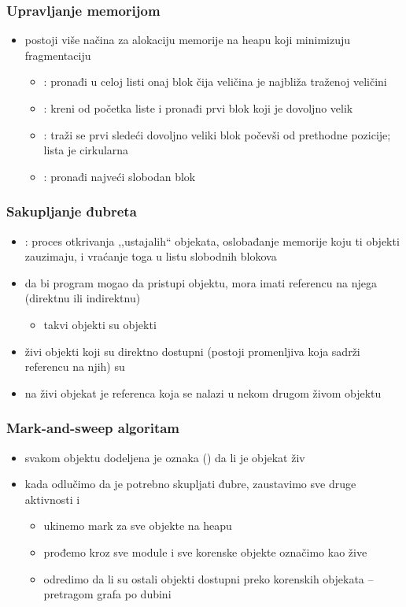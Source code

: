 \documentclass[compress,aspectratio=169]{beamer}
\begin{document}
\begin{frame}[fragile]
  \frametitle{Upravljanje memorijom}
  \begin{itemize}
    \item postoji više načina za alokaciju memorije na heapu koji 
    minimizuju fragmentaciju
    \begin{itemize}
      \item {}: pronađi u celoj listi onaj blok čija 
      veličina je najbliža traženoj veličini 
      \item {}: kreni od početka liste i pronađi prvi
      blok koji je dovoljno velik
      \item {}: traži se prvi sledeći dovoljno veliki blok
      počevši od prethodne pozicije; lista je cirkularna
      \item {}: pronađi najveći slobodan blok
    \end{itemize}
  \end{itemize}
\end{frame}

\begin{frame}[fragile]
  \frametitle{Sakupljanje đubreta}
  \begin{itemize}
    \item {}: proces otkrivanja ,,ustajalih`` 
    objekata, oslobađanje memorije koju ti objekti zauzimaju, i vraćanje 
    toga u listu slobodnih blokova
    \item da bi program mogao da pristupi objektu, mora imati referencu
    na njega (direktnu ili indirektnu)
    \begin{itemize}
      \item takvi objekti su  objekti
    \end{itemize}
    \item živi objekti koji su direktno dostupni (postoji promenljiva
    koja sadrži referencu na njih) su 
    \item {} na živi objekat je referenca koja
    se nalazi u nekom drugom živom objektu
  \end{itemize}
\end{frame}

\begin{frame}[fragile]
  \frametitle{Mark-and-sweep algoritam}
  \begin{itemize}
    \item svakom objektu dodeljena je oznaka () da li je
    objekat živ
    \item kada odlučimo da je potrebno skupljati đubre, zaustavimo sve
    druge aktivnosti i 
    \begin{itemize}
      \item ukinemo mark za sve objekte na heapu
      \item prođemo kroz sve module i sve korenske objekte označimo kao žive
      \item odredimo da li su ostali objekti dostupni preko korenskih objekata -- pretragom grafa po dubini
    \end{itemize}
  \end{itemize}
\end{frame}
\end{document}
